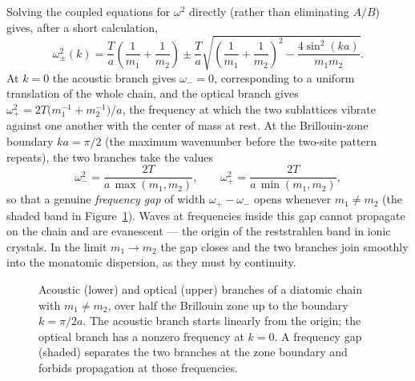 \begin{example}
Solving the coupled equations for $\omega^2$ directly (rather than eliminating $A/B$) gives, after a short calculation,
\begin{equation}
    \omega^2_{\pm}(k) = \frac{T}{a}\!\left(\frac{1}{m_1} + \frac{1}{m_2}\right) \pm \frac{T}{a}\sqrt{\left(\frac{1}{m_1} + \frac{1}{m_2}\right)^{\!2} - \frac{4\sin^2(ka)}{m_1 m_2}}.
\end{equation}
At $k = 0$ the acoustic branch gives $\omega_- = 0$, corresponding to a uniform translation of the whole chain, and the optical branch gives $\omega_+^2 = 2T\bigl(m_1^{-1} + m_2^{-1}\bigr)/a$, the frequency at which the two sublattices vibrate against one another with the center of mass at rest. At the Brillouin-zone boundary $ka = \pi/2$ (the maximum wavenumber before the two-site pattern repeats), the two branches take the values
\begin{equation}
    \omega_-^2 = \frac{2T}{a\,\max(m_1, m_2)}, \qquad \omega_+^2 = \frac{2T}{a\,\min(m_1, m_2)},
\end{equation}
so that a genuine \emph{frequency gap} of width $\omega_+ - \omega_-$ opens whenever $m_1 \neq m_2$ (the shaded band in Figure~\ref{fig:diatomic}). Waves at frequencies inside this gap cannot propagate on the chain and are evanescent --- the origin of the reststrahlen band in ionic crystals. In the limit $m_1 \to m_2$ the gap closes and the two branches join smoothly into the monatomic dispersion, as they must by continuity.
\end{example}

\begin{figure}[H]
    \centering
    \caption{Acoustic (lower) and optical (upper) branches of a diatomic chain with $m_1 \neq m_2$, over half the Brillouin zone up to the boundary $k = \pi/2a$. The acoustic branch starts linearly from the origin; the optical branch has a nonzero frequency at $k = 0$. A frequency gap (shaded) separates the two branches at the zone boundary and forbids propagation at those frequencies.}
    \label{fig:diatomic}
\end{figure}
